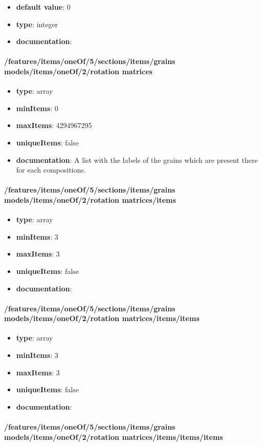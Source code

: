 \begin{itemize}\item {\bf default value}: 0
\item {\bf type}: integer
\item {\bf documentation}: 
\end{itemize}\paragraph{/features/items/oneOf/5/sections/items/grains models/items/oneOf/2/rotation matrices}
\begin{itemize}\item {\bf type}: array
\item {\bf minItems}: 0
\item {\bf maxItems}: 4294967295
\item {\bf uniqueItems}: false
\item {\bf documentation}: A list with the labels of the grains which are present there for each compositions.
\end{itemize}\paragraph{/features/items/oneOf/5/sections/items/grains models/items/oneOf/2/rotation matrices/items}
\begin{itemize}\item {\bf type}: array
\item {\bf minItems}: 3
\item {\bf maxItems}: 3
\item {\bf uniqueItems}: false
\item {\bf documentation}: 
\end{itemize}\paragraph{/features/items/oneOf/5/sections/items/grains models/items/oneOf/2/rotation matrices/items/items}
\begin{itemize}\item {\bf type}: array
\item {\bf minItems}: 3
\item {\bf maxItems}: 3
\item {\bf uniqueItems}: false
\item {\bf documentation}: 
\end{itemize}\paragraph{/features/items/oneOf/5/sections/items/grains models/items/oneOf/2/rotation matrices/items/items/items}
